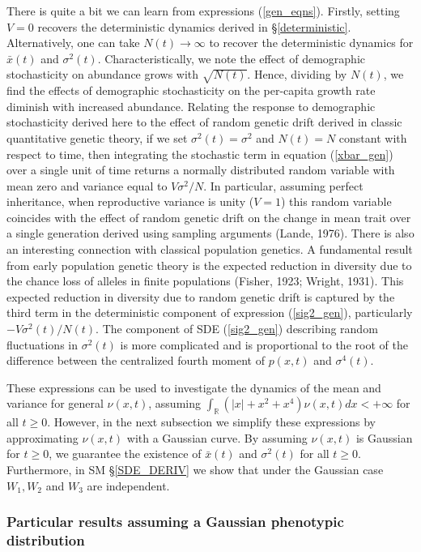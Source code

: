 \documentclass[]{elsarticle} %
\begin{document}
There is quite a bit we can learn from expressions (\ref{gen_eqns}).
Firstly, setting \(V=0\) recovers the deterministic dynamics derived in
\S\ref{deterministic}. Alternatively, one can take \(N(t)\to\infty\) to
recover the deterministic dynamics for \(\bar x(t)\) and
\(\sigma^2(t)\). Characteristically, we note the effect of demographic
stochasticity on abundance grows with \(\sqrt{N(t)}\). Hence, dividing
by \(N(t)\), we find the effects of demographic stochasticity on the
per-capita growth rate diminish with increased abundance. Relating the
response to demographic stochasticity derived here to the effect of
random genetic drift derived in classic quantitative genetic theory, if
we set \(\sigma^2(t)=\sigma^2\) and \(N(t)=N\) constant with respect to
time, then integrating the stochastic term in equation (\ref{xbar_gen})
over a single unit of time returns a normally distributed random
variable with mean zero and variance equal to \(V\sigma^2/N\). In
particular, assuming perfect inheritance, when reproductive variance is
unity (\(V=1\)) this random variable coincides with the effect of random
genetic drift on the change in mean trait over a single generation
derived using sampling arguments (Lande, 1976). There is also an
interesting connection with classical population genetics. A fundamental
result from early population genetic theory is the expected reduction in
diversity due to the chance loss of alleles in finite populations
(Fisher, 1923; Wright, 1931). This expected reduction in diversity due
to random genetic drift is captured by the third term in the
deterministic component of expression (\ref{sig2_gen}), particularly
\(-V\sigma^2(t)/N(t)\). The component of SDE (\ref{sig2_gen}) describing
random fluctuations in \(\sigma^2(t)\) is more complicated and is
proportional to the root of the difference between the centralized
fourth moment of \(p(x,t)\) and \(\sigma^4(t)\).

These expressions can be used to investigate the dynamics of the mean
and variance for general \(\nu(x,t)\), assuming
\(\int_\mathbb{R}(|x|+x^2+x^4)\nu(x,t)dx<+\infty\) for all \(t\geq0\).
However, in the next subsection we simplify these expressions by
approximating \(\nu(x,t)\) with a Gaussian curve. By assuming
\(\nu(x,t)\) is Gaussian for \(t\geq0\), we guarantee the existence of
\(\bar x(t)\) and \(\sigma^2(t)\) for all \(t\geq0\). Furthermore, in SM
\S\ref{SDE_DERIV} we show that under the Gaussian case \(W_1,W_2\) and
\(W_3\) are independent.

\hypertarget{particular-results-assuming-a-gaussian-phenotypic-distribution}{%
\subsubsection{\texorpdfstring{Particular results assuming a Gaussian
phenotypic distribution
\label{particular}}{Particular results assuming a Gaussian phenotypic distribution }}\label{particular-results-assuming-a-gaussian-phenotypic-distribution}}
\end{document}
